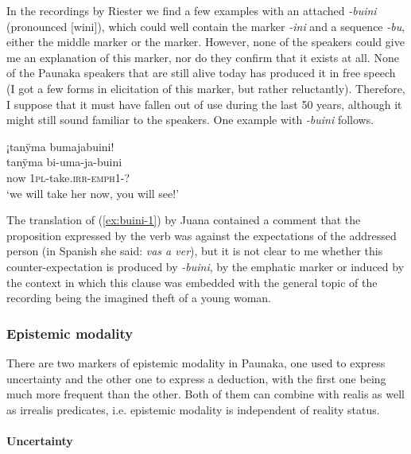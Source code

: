 In the recordings by Riester we find a few examples with an attached \textit{-buini} (pronounced [wini]), which could well contain the  marker \textit{-ini} and a sequence \textit{-bu}, either the middle marker or the  marker. However, none of the speakers could give me an explanation of this marker, nor do they confirm that it exists at all. None of the Paunaka speakers that are still alive today has produced it in free speech (I got a few forms in elicitation of this marker, but rather reluctantly). Therefore, I suppose that it must have fallen out of use during the last 50 years, although it might still sound familiar to the speakers. One example with \textit{-buini} follows.

\ea\label{ex:buini-1}
\begingl 
\glpreamble ¡tanÿma bumajabuini!\\
\gla tanÿma bi-uma-ja-buini\\ 
\glb now 1\textsc{pl}-take.\textsc{irr}-\textsc{emph}1-?\\ 
\glft ‘we will take her now, you will see!’
\trailingcitation{[nxx-a630101g-3.048]}
\xe

The translation of (\ref{ex:buini-1}) by Juana contained a comment that the proposition expressed by the verb was against the expectations of the addressed person (in Spanish she said: \textit{vas a ver}), but it is not clear to me whether this counter-ex\-pec\-ta\-tion is produced by \textit{-buini}, by the emphatic marker or induced by the context in which this clause was embedded with the general topic of the recording being the imagined theft of a young woman.

\subsubsection{Epistemic modality}\label{sec:Epistemic_Mod}

There are two markers of epistemic modality in Paunaka, one used to express uncertainty and the other one to express a deduction, with the first one being much more frequent than the other. Both of them can combine with realis as well as irrealis predicates, i.e. epistemic modality is independent of reality status.

\paragraph{Uncertainty}\label{sec:ModalityUncertainty}

